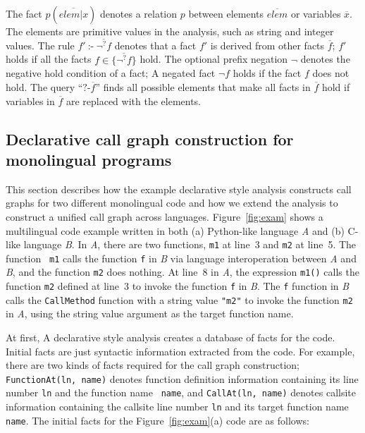 \noindent
The fact $p(\overline{elem | x})$ denotes a relation $p$ between elements
$\overline{elem}$ or variables $\overline{x}$. The elements are primitive
values in the analysis, such as string and integer values.  The rule $f'\
\mbox{:-}\ \overline{\neg^? f}$ denotes that a fact $f'$ is derived from other
facts $\overline{f}$; $f'$ holds if all the facts $f \in \{\overline{\neg^?
f}\}$ hold. The optional prefix negation $\neg$ denotes the negative hold
condition of a fact; A negated fact $\neg f$ holds if the fact $f$ does not
hold. The query ``$\mbox{?-} \overline{f}$'' finds all possible elements that
make all facts in $\overline{f}$ hold if variables in $\overline{f}$ are
replaced with the elements.


\subsection{Declarative call graph construction for monolingual programs}\label{lab:ovmono}


This section describes how the example declarative style analysis constructs call graphs
for two different monolingual code and how we extend the analysis to construct
a unified call graph across languages.
Figure~\ref{fig:exam} shows a multilingual code example written in both (a)
Python-like language {\it A} and (b) C-like language {\it B}. In {\it A}, there
are two functions, {\tt m1} at line~3 and {\tt m2} at line~5. The function {\tt
m1} calls the function {\tt f} in {\it B} via language interoperation between
{\it A} and {\it B}, and the function {\tt m2} does nothing. At line~8 in {\it
A}, the expression {\tt m1()} calls the function {\tt m2} defined at line~3 to
invoke the function {\tt f} in {\it B}.
The {\tt f} function in {\it B} calls the {\tt CallMethod} function with a
string value {\tt "m2"} to invoke the function {\tt m2} in {\it A}, using the
string value argument as the target function name.


At first, A declarative style analysis creates a database of facts for the
code. Initial facts are just syntactic information extracted from the code.
For example, there are two kinds of facts required for the call graph
construction; {\tt FunctionAt(ln, name)} denotes function definition
information containing its line number {\tt ln} and the function name {\tt
name}, and {\tt CallAt(ln, name)} denotes callsite information
containing the callsite line number {\tt ln} and its target function name {\tt
name}. The initial facts for the Figure~\ref{fig:exam}(a) code are as follows: 


